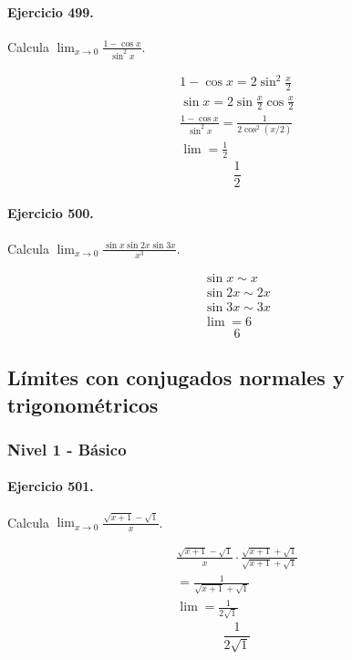 \documentclass[11pt,a4paper]{article}
\begin{document}
\paragraph{Ejercicio 499.} Calcula $\displaystyle \lim_{x\to0}\frac{1-\cos x}{\sin^2x}$.

\[
\begin{aligned}
1-\cos x=2\sin^2\frac{x}{2}\\
\sin x=2\sin\frac{x}{2}\cos\frac{x}{2}\\
\frac{1-\cos x}{\sin^2x}=\frac{1}{2\cos^2(x/2)}\\
\lim=\frac12
\end{aligned}
\]
\[\boxed{\frac12}\]


\paragraph{Ejercicio 500.} Calcula $\displaystyle \lim_{x\to0}\frac{\sin x\sin2x\sin3x}{x^3}$.

\[
\begin{aligned}
\sin x\sim x\\
\sin2x\sim2x\\
\sin3x\sim3x\\
\lim=6
\end{aligned}
\]
\[\boxed{6}\]


\newpage

\subsection*{Límites con conjugados normales y trigonométricos}


\subsubsection*{Nivel 1 - Básico}

\paragraph{Ejercicio 501.} Calcula $\displaystyle\lim_{x\to0}\frac{\sqrt{x+1}-\sqrt{1}}{x}$.

\[
\begin{aligned}
\frac{\sqrt{x+1}-\sqrt{1}}{x}\cdot \frac{\sqrt{x+1}+\sqrt{1}}{\sqrt{x+1}+\sqrt{1}}\\
=\frac{1}{\sqrt{x+1}+\sqrt{1}}\\
\lim=\frac{1}{2\sqrt{1}}
\end{aligned}
\]
\[\boxed{\frac{1}{2\sqrt{1}}}\]
\end{document}
